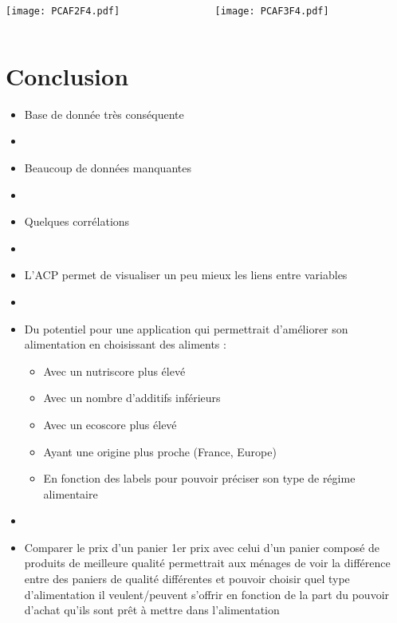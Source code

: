 \begin{frame}
  \begin{columns}
    \begin{column}{.5\textwidth}
      \texttt{[image: PCAF2F4.pdf]}
    \end{column}
    \begin{column}{.5\textwidth}
      \texttt{[image: PCAF3F4.pdf]}
    \end{column}
  \end{columns}
\end{frame}

\section{Conclusion}
\begin{frame}
  \begin{itemize}
    \item Base de donnée très conséquente
    \item[]
    \item Beaucoup de données manquantes
    \item[]
    \item Quelques corrélations
    \item[]
    \item L'ACP permet de visualiser un peu mieux les liens entre variables
    \item[]
    \item Du potentiel pour une application qui permettrait d'améliorer son alimentation en choisissant des aliments :
          \begin{itemize}
            \item Avec un nutriscore plus élevé
            \item Avec un nombre d'additifs inférieurs
            \item Avec un ecoscore plus élevé
            \item Ayant une origine plus proche (France, Europe)
            \item En fonction des labels pour pouvoir préciser son type de régime alimentaire
          \end{itemize}
    \item[]
    \item Comparer le prix d'un panier 1er prix avec celui d'un panier composé de produits
          de meilleure qualité permettrait aux ménages de voir la différence entre des paniers
          de qualité différentes et pouvoir choisir quel type d'alimentation il veulent/peuvent s'offrir
          en fonction de la part du pouvoir d'achat qu'ils sont prêt à mettre dans l'alimentation
  \end{itemize}
\end{frame}

